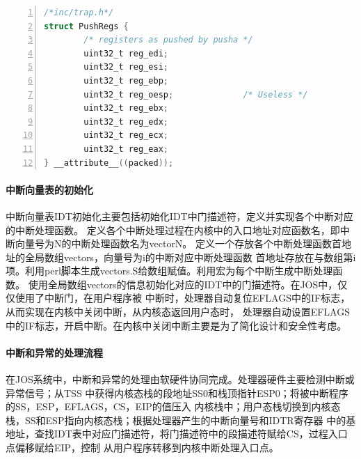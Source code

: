 \documentclass[12pt,openany,a4paper]{report}
\begin{document}
		\begin{lstlisting}[language=C,numbers=left,numberstyle=\tiny,keywordstyle=\color{blue},frame=shadowbox,rulesepcolor=\color{red!20!green!20!blue!20},commentstyle=\color{red!50!green!50!blue!50!}\selectfont,basicstyle=\ttfamily\fontsize{8}{8}\selectfont]
/*inc/trap.h*/
struct PushRegs {
        /* registers as pushed by pusha */
        uint32_t reg_edi;
        uint32_t reg_esi;
        uint32_t reg_ebp;
        uint32_t reg_oesp;              /* Useless */
        uint32_t reg_ebx;
        uint32_t reg_edx;
        uint32_t reg_ecx;
        uint32_t reg_eax;
} __attribute__((packed));
		\end{lstlisting}
	\paragraph{中断向量表的初始化}
	    中断向量表IDT初始化主要包括初始化IDT中门描述符，定义并实现各个中断对应的中断处理函数。
	定义各个中断处理过程在内核中的入口地址对应函数名，即中断向量号为N的中断处理函数名为vectorN。
	定义一个存放各个中断处理函数首地址的全局数组vectors，向量号为i的中断对应中断处理函数
	首地址存放在与数组第i项。利用perl脚本生成vectors.S给数组赋值。利用宏为每个中断生成中断处理函数。
	使用全局数组vectors的信息初始化对应的IDT中的门描述符。在JOS中，仅仅使用了中断门，在用户程序被
	中断时，处理器自动复位EFLAGS中的IF标志，从而实现在内核中关闭中断，从内核态返回用户态时，
	处理器自动设置EFLAGS中的IF标志，开启中断。在内核中关闭中断主要是为了简化设计和安全性考虑。\par
	\paragraph{中断和异常的处理流程}
	    在JOS系统中，中断和异常的处理由软硬件协同完成。处理器硬件主要检测中断或异常信号；从TSS
	中获得内核态栈的段地址SS0和栈顶指针ESP0；将被中断程序的SS，ESP，EFLAGS，CS，EIP的值压入
	内核栈中；用户态栈切换到内核态栈，SS和ESP指向内核态栈；根据处理器产生的中断向量号和IDTR寄存器
	中的基地址，查找IDT表中对应门描述符，将门描述符中的段描述符赋给CS，过程入口点偏移赋给EIP，控制
	从用户程序转移到内核中断处理入口点。\par
	
\end{document}
